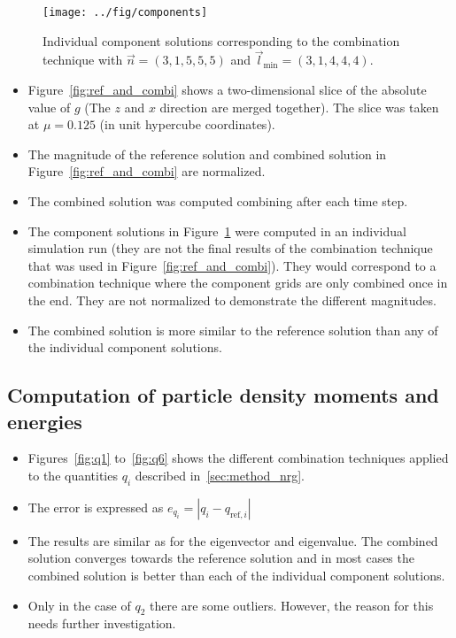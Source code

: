 \documentclass{scrartcl}
\newcommand{\lmin}{\vec{l}_{\text{min}}}
\begin{document}
\begin{figure}[h]
	\centering
	\texttt{[image: ../fig/components]}
	\caption{Individual component solutions corresponding to the combination technique with $\vec n = (3,1,5,5,5)$ and $\lmin = (3,1,4,4,4)$.}
	\label{fig:components}
\end{figure}

\begin{itemize}
	\item Figure~\ref{fig:ref_and_combi} shows a two-dimensional slice of the absolute value of $g$ (The $z$ and $x$ direction are merged together). The slice was taken at $\mu = 0.125$ (in unit hypercube coordinates). 
	\item The magnitude of the reference solution and combined solution in Figure~\ref{fig:ref_and_combi} are normalized.
	\item The combined solution was computed combining after each time step.
	\item The component solutions in Figure~\ref{fig:components} were computed in an individual simulation run (they are not the final results of the combination technique that was used in Figure~\ref{fig:ref_and_combi}).
	They would correspond to a combination technique where the component grids are only combined once in the end.
	They are not normalized to demonstrate the different magnitudes.
	\item The combined solution is more similar to the reference solution than any of the individual component solutions.
\end{itemize}

\subsection*{Computation of particle density moments and energies}

\begin{itemize}
	\item Figures~\ref{fig:q1} to~\ref{fig:q6} shows the different combination techniques applied to the quantities $q_i$ described in~\ref{sec:method_nrg}. 
	\item The error is expressed as $e_{q_i} = | q_i - q_{\text{ref},i} |$
	\item The results are similar as for the eigenvector and eigenvalue. The combined solution converges towards the reference solution and in most cases the combined solution is better than each of the individual component solutions. 
	\item Only in the case of $q_2$ there are some outliers. However, the reason for this needs further investigation.
\end{itemize}
\end{document}
